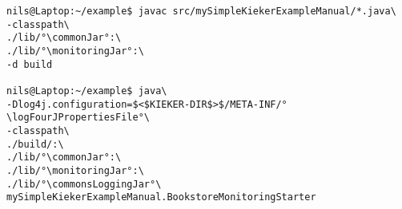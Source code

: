 \begin{lstlisting} 			
nils@Laptop:~/example$ javac src/mySimpleKiekerExampleManual/*.java\
-classpath\ 		
./lib/°\commonJar°:\
./lib/°\monitoringJar°:\
-d build

nils@Laptop:~/example$ java\
-Dlog4j.configuration=$<$KIEKER-DIR$>$/META-INF/°\logFourJPropertiesFile°\
-classpath\ 	
./build/:\
./lib/°\commonJar°:\
./lib/°\monitoringJar°:\
./lib/°\commonsLoggingJar°\
mySimpleKiekerExampleManual.BookstoreMonitoringStarter 
\end{lstlisting}
